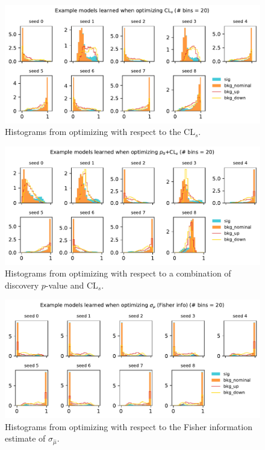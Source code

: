 \documentclass[
  11pt,
  numbers=noendperiod]{book}
\begin{document}
\begin{figure}

{\centering \includegraphics{./images/new-hist-models-CLs-20bin.pdf}

}

\caption{\label{fig-hists-20nobin-CLs}Histograms from optimizing with
respect to the \(\mathrm{CL}_s\).}

\end{figure}

\begin{figure}

{\centering \includegraphics{./images/new-hist-models-COMB-20nobin.pdf}

}

\caption{\label{fig-hists-20bin-comb}Histograms from optimizing with
respect to a combination of discovery \(p\)-value and
\(\mathrm{CL}_s\).}

\end{figure}

\begin{figure}

{\centering \includegraphics{./images/new-hist-models-poi_uncert-20nobin.pdf}

}

\caption{\label{fig-hists-20bin-poi-uncert}Histograms from optimizing
with respect to the Fisher information estimate of
\(\sigma_{\hat{\mu}}\).}

\end{figure}
\end{document}
